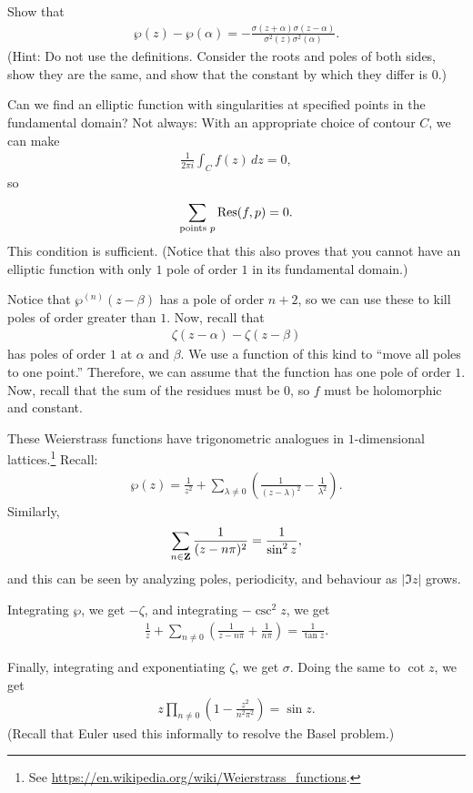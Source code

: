 \documentclass[11pt, oneside,margin=1in]{article}
\begin{document}
\begin{exercise}\label{}\text{}
Show that
\begin{align*}
	\wp(z) - \wp (\alpha) = -  \frac{\sigma(z+\alpha)\sigma (z-\alpha)}{\sigma^2 (z)\sigma^2 (\alpha)}.
\end{align*}
(Hint: Do not use the definitions. Consider the roots and poles of both sides, show they are the same, and show that the constant by which they differ is $0$.)
\end{exercise}

Can we find an elliptic function with singularities at specified points in the fundamental domain? Not always: With an appropriate choice of contour $C$, we can make
\begin{align*}
	\frac{1}{2\pi i} \int_{C}^{} f(z)  \, dz = 0, 
\end{align*}
so 
\begin{align*}
	\sum_{\textrm{points $p$}}^{} \operatorname{Res}(f, p) = 0.
\end{align*}
This condition is sufficient. (Notice that this also proves that you cannot have an elliptic function with only $1$ pole of order $1$ in its fundamental domain.)

Notice that $\wp^{(n)} (z-\beta)$ has a pole of order $n+2$, so we can use these to kill poles of order greater than $1$. Now, recall that
\begin{align*}
	\zeta(z-\alpha) - \zeta (z-\beta)
\end{align*}
has poles of order $1$ at $\alpha$ and $\beta$. We use a function of this kind to ``move all poles to one point.'' Therefore, we can assume that the function has one pole of order $1$. Now, recall that the sum of the residues must be $0$, so $f$ must be holomorphic and constant.

These Weierstrass functions have trigonometric analogues in $1$-dimensional lattices.\footnote{See \url{https://en.wikipedia.org/wiki/Weierstrass_functions}.} Recall:
\begin{align*}
	\wp(z) =  \frac{1}{z^2} + \sum_{\lambda\ne 0}^{} \left( \frac{1}{(z-\lambda) ^2} - \frac{1}{\lambda^2} \right). 
\end{align*}
Similarly,
\begin{align*}
	\sum_{n\in\mathbf Z}^{} \frac{1}{(z-n\pi)^2} = \frac{1}{\sin^2z},
\end{align*}
and this can be seen by analyzing poles, periodicity, and behaviour as $\left\lvert \Im z \right\rvert$ grows. 

Integrating $\wp$, we get $-\zeta$, and integrating $-\csc^2z$, we get
\begin{align*}
	\frac{1}{z}+\sum_{n\ne 0}^{} \left( \frac{1}{z-n\pi}+ \frac{1}{n\pi} \right) = \frac{1}{\tan z}.
\end{align*}

Finally, integrating and exponentiating $\zeta$, we get $\sigma$. Doing the same to $\cot z$, we get
\begin{align*}
	z\prod_{n\ne 0} \left( 1-\frac{z^2}{n^2\pi^2} \right) = \sin z.
\end{align*}
(Recall that Euler used this informally to resolve the Basel problem.)
\printindex
\end{document}
